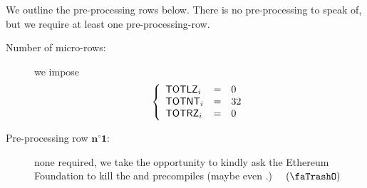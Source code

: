 \begin{center}
\end{center}
We outline the pre-processing rows below.
There is no pre-processing to speak of, but we require at least one pre-processing-row.
\begin{description}
	\item[Number of micro-rows:]
		we impose
		\[
			\left\{ \begin{array}{lcl}
				\textsf{TOTLZ}    _{i}     & = & 0 \\ 
				\textsf{TOTNT}    _{i}     & = & 32 \\ 
				\textsf{TOTRZ}    _{i}     & = & 0 \\ 
			\end{array} \right.
		\]
	\item[Pre-processing row $\bm{n^\circ 1}$:] 
		none required, we take the opportunity to kindly ask the Ethereum Foundation to kill the  and  precompiles \faSmileO{} (maybe even .) $\quad(\trash)$
\end{description}
